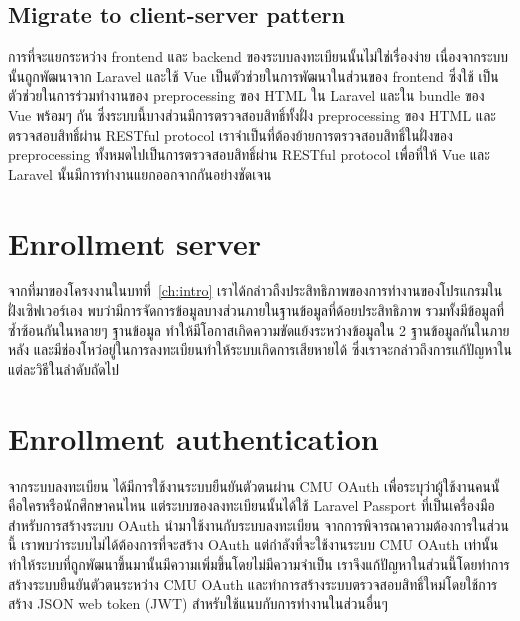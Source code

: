 
\subsection{Migrate to client-server pattern}

การที่จะแยกระหว่าง frontend และ backend ของระบบลงทะเบียนนั้นไม่ใช่เรื่องง่าย เนื่องจากระบบนั้นถูกพัฒนาจาก Laravel และใช้ Vue เป็นตัวช่วยในการพัฒนาในส่วนของ frontend ซึ่งใช้  เป็นตัวช่วยในการร่วมทำงานของ preprocessing ของ HTML ใน Laravel และใน bundle ของ Vue พร้อมๆ กัน ซึ่งระบบนี้บางส่วนมีการตรวจสอบสิทธิ์ทั้งฝั่ง preprocessing ของ HTML และตรวจสอบสิทธิ์ผ่าน RESTful protocol เราจำเป็นที่ต้องย้ายการตรวจสอบสิทธิ์ในฝั่งของ preprocessing ทั้งหมดไปเป็นการตรวจสอบสิทธิ์ผ่าน RESTful protocol เพื่อที่ให้ Vue และ Laravel นั้นมีการทำงานแยกออกจากกันอย่างชัดเจน

\section{Enrollment server}

จากที่มาของโครงงานในบทที่~\ref{ch:intro} เราได้กล่าวถืงประสิทธิภาพของการทำงานของโปรแกรมในฝั่งเซิฟเวอร์เอง พบว่ามีการจัดการข้อมูลบางส่วนภายในฐานข้อมูลที่ด้อยประสิทธิภาพ รวมทั้งมีข้อมูลที่ซ้ำซ้อนกันในหลายๆ ฐานข้อมูล ทำให้มีโอกาสเกิดความขัดแย้งระหว่างข้อมูลใน 2 ฐานข้อมูลกันในภายหลัง และมีช่องโหว่อยู่ในการลงทะเบียนทำให้ระบบเกิดการเสียหายได้ ซึ่งเราจะกล่าวถึงการแก้ปัญหาในแต่ละวิธีในลำดับถัดไป

\section{Enrollment authentication}
จากระบบลงทะเบียน ได้มีการใช้งานระบบยืนยันตัวตนผ่าน CMU OAuth เพื่อระบุว่าผู้ใช้งานคนนั้คือใครหรือนักศึกษาคนไหน แต่ระบบของลงทะเบียนนั้นได้ใช้ Laravel Passport ที่เป็นเครื่องมือสำหรับการสร้างระบบ OAuth นำมาใช้งานกับระบบลงทะเบียน จากการพิจารณาความต้องการในส่วนนี้ เราพบว่าระบบไม่ได้ต้องการที่จะสร้าง OAuth แต่กำลังที่จะใช้งานระบบ CMU OAuth เท่านั้น ทำให้ระบบที่ถูกพัฒนาขึ้นมานั้นมีความเพิ่มขึ้นโดยไม่มีความจำเป็น เราจึงแก้ปัญหาในส่วนนี้โดยทำการสร้างระบบยืนยันตัวตนระหว่าง CMU OAuth และทำการสร้างระบบตรวจสอบสิทธิ์ใหม่โดยใช้การสร้าง JSON web token (JWT) สำหรับใช้แนบกับการทำงานในส่วนอื่นๆ


